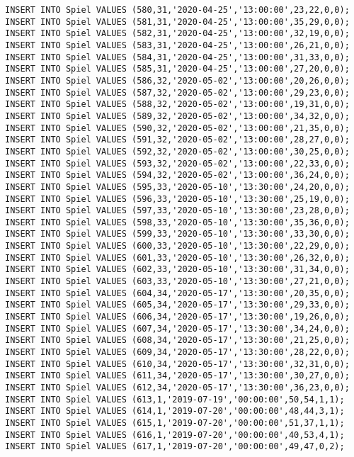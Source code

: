 \documentclass{lehramt-informatik-aufgabe}
\begin{document}
\begin{verbatim}
INSERT INTO Spiel VALUES (580,31,'2020-04-25','13:00:00',23,22,0,0);
INSERT INTO Spiel VALUES (581,31,'2020-04-25','13:00:00',35,29,0,0);
INSERT INTO Spiel VALUES (582,31,'2020-04-25','13:00:00',32,19,0,0);
INSERT INTO Spiel VALUES (583,31,'2020-04-25','13:00:00',26,21,0,0);
INSERT INTO Spiel VALUES (584,31,'2020-04-25','13:00:00',31,33,0,0);
INSERT INTO Spiel VALUES (585,31,'2020-04-25','13:00:00',27,20,0,0);
INSERT INTO Spiel VALUES (586,32,'2020-05-02','13:00:00',20,26,0,0);
INSERT INTO Spiel VALUES (587,32,'2020-05-02','13:00:00',29,23,0,0);
INSERT INTO Spiel VALUES (588,32,'2020-05-02','13:00:00',19,31,0,0);
INSERT INTO Spiel VALUES (589,32,'2020-05-02','13:00:00',34,32,0,0);
INSERT INTO Spiel VALUES (590,32,'2020-05-02','13:00:00',21,35,0,0);
INSERT INTO Spiel VALUES (591,32,'2020-05-02','13:00:00',28,27,0,0);
INSERT INTO Spiel VALUES (592,32,'2020-05-02','13:00:00',30,25,0,0);
INSERT INTO Spiel VALUES (593,32,'2020-05-02','13:00:00',22,33,0,0);
INSERT INTO Spiel VALUES (594,32,'2020-05-02','13:00:00',36,24,0,0);
INSERT INTO Spiel VALUES (595,33,'2020-05-10','13:30:00',24,20,0,0);
INSERT INTO Spiel VALUES (596,33,'2020-05-10','13:30:00',25,19,0,0);
INSERT INTO Spiel VALUES (597,33,'2020-05-10','13:30:00',23,28,0,0);
INSERT INTO Spiel VALUES (598,33,'2020-05-10','13:30:00',35,36,0,0);
INSERT INTO Spiel VALUES (599,33,'2020-05-10','13:30:00',33,30,0,0);
INSERT INTO Spiel VALUES (600,33,'2020-05-10','13:30:00',22,29,0,0);
INSERT INTO Spiel VALUES (601,33,'2020-05-10','13:30:00',26,32,0,0);
INSERT INTO Spiel VALUES (602,33,'2020-05-10','13:30:00',31,34,0,0);
INSERT INTO Spiel VALUES (603,33,'2020-05-10','13:30:00',27,21,0,0);
INSERT INTO Spiel VALUES (604,34,'2020-05-17','13:30:00',20,35,0,0);
INSERT INTO Spiel VALUES (605,34,'2020-05-17','13:30:00',29,33,0,0);
INSERT INTO Spiel VALUES (606,34,'2020-05-17','13:30:00',19,26,0,0);
INSERT INTO Spiel VALUES (607,34,'2020-05-17','13:30:00',34,24,0,0);
INSERT INTO Spiel VALUES (608,34,'2020-05-17','13:30:00',21,25,0,0);
INSERT INTO Spiel VALUES (609,34,'2020-05-17','13:30:00',28,22,0,0);
INSERT INTO Spiel VALUES (610,34,'2020-05-17','13:30:00',32,31,0,0);
INSERT INTO Spiel VALUES (611,34,'2020-05-17','13:30:00',30,27,0,0);
INSERT INTO Spiel VALUES (612,34,'2020-05-17','13:30:00',36,23,0,0);
INSERT INTO Spiel VALUES (613,1,'2019-07-19','00:00:00',50,54,1,1);
INSERT INTO Spiel VALUES (614,1,'2019-07-20','00:00:00',48,44,3,1);
INSERT INTO Spiel VALUES (615,1,'2019-07-20','00:00:00',51,37,1,1);
INSERT INTO Spiel VALUES (616,1,'2019-07-20','00:00:00',40,53,4,1);
INSERT INTO Spiel VALUES (617,1,'2019-07-20','00:00:00',49,47,0,2);

\end{verbatim}
\end{document}
